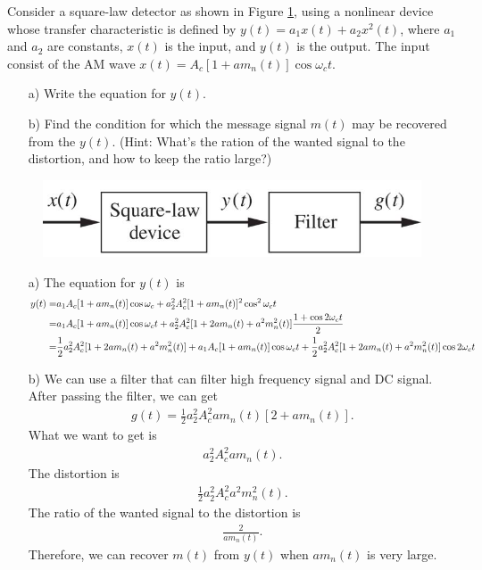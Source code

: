 \documentclass{assignment}
\begin{document}
\begin{prob}
    Consider a square-law detector as shown in Figure \ref{Assignment-4-Problem-5}, using a nonlinear device whose transfer characteristic is defined by $y(t)=a_1x(t)+a_2x^2(t)$, where $a_1$ and $a_2$ are constants, $x(t)$ is the input, and $y(t)$ is the output. The input consist of the AM wave $x(t)=A_c[1+am_n(t)]\cos\omega_ct$.
    \begin{itemize}
        \item[a)] Write the equation for $y(t)$.
        \item[b)] Find the condition for which the message signal $m(t)$ may be recovered from the $y(t)$. (Hint: What's the ration of the wanted signal to the distortion, and how to keep the ratio large?)
    \end{itemize}
    \begin{figure}[h]
        \centering
        \includegraphics[width=.5\columnwidth]{Assignment-4-Problem-5.jpg}
        \caption{}
        \label{Assignment-4-Problem-5}
    \end{figure}
\end{prob}
\begin{sol}
    \begin{itemize}
        \item[a)] The equation for $y(t)$ is
        \begin{align}
            \notag y(t)=&a_1A_c[1+am_n(t)]\cos\omega_c+a_2^2A_c^2[1+am_n(t)]^2\cos^2\omega_ct\\
            \notag=&a_1A_c[1+am_n(t)]\cos\omega_ct+a_2^2A_c^2[1+2am_n(t)+a^2m_n^2(t)]\frac{1+\cos 2\omega_ct}{2}\\
            =&\frac{1}{2}a_2^2A_c^2[1+2am_n(t)+a^2m_n^2(t)]+a_1A_c[1+am_n(t)]\cos\omega_ct+\frac{1}{2}a_2^2A_c^2[1+2am_n(t)+a^2m_n^2(t)]\cos 2\omega_ct
        \end{align}
        \item[b)] We can use a filter that can filter high frequency signal and DC signal. After passing the filter, we can get
        \begin{align}
            g(t)=\frac{1}{2}a_2^2A_c^2am_n(t)[2+am_n(t)].
        \end{align}
        What we want to get is
        \begin{align}
            a_2^2A_c^2am_n(t).
        \end{align}
        The distortion is
        \begin{align}
            \frac{1}{2}a_2^2A_c^2a^2m_n^2(t).
        \end{align}
        The ratio of the wanted signal to the distortion is
        \begin{align}
            \frac{2}{am_n(t)}.
        \end{align}
        Therefore, we can recover $m(t)$ from $y(t)$ when $am_n(t)$ is very large.
    \end{itemize}
\end{sol}
\end{document}
